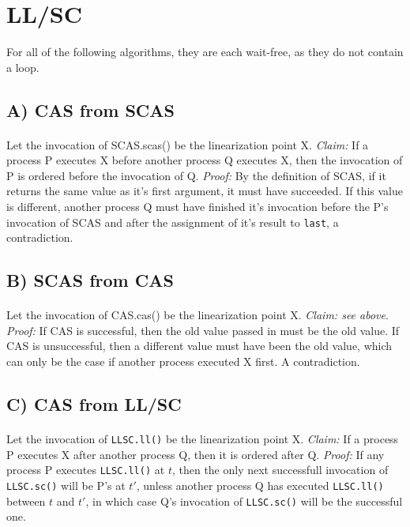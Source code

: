 \documentclass[10pt, letterpaper]{article}
\begin{document}
\maketitle

\section{LL/SC}


For all of the following algorithms, they are each wait-free, as they do not contain a loop.
\subsection*{A) CAS from SCAS}

\paragraph{} Let the invocation of SCAS.scas() be the linearization point X. \textit{Claim:} If a process P executes X before another process Q executes X, then the invocation of P is ordered before the invocation of Q. \textit{Proof:} By the definition of SCAS, if it returns the same value as it's first argument, it must have succeeded. If this value is different, another process Q must have finished it's invocation before the P's invocation of SCAS and after the assignment of it's result to \texttt{last}, a contradiction.

\subsection*{B) SCAS from CAS}

\paragraph{} Let the invocation of CAS.cas() be the linearization point X. \textit{Claim: see above}. \textit{Proof:} If CAS is successful, then the old value passed in must be the old value. If CAS is unsuccessful, then a different value must have been the old value, which can only be the case if another process executed X first. A contradiction.

\subsection*{C) CAS from LL/SC} 

\paragraph{} Let the invocation of \texttt{LLSC.ll()} be the linearization point X. \textit{Claim:} If a process P executes X after another process Q, then it is ordered after Q. \textit{Proof:} If any process P executes \texttt{LLSC.ll()} at $t$, then the only next successfull invocation of \texttt{LLSC.sc()} will be P's at $t'$, unless another process Q has executed \texttt{LLSC.ll()} between $t$ and $t'$, in which case Q's invocation of \texttt{LLSC.sc()} will be the successful one.
\end{document}
